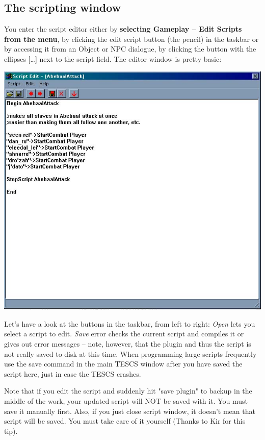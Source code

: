 \documentclass[
]{article}
\begin{document}
\hypertarget{the-scripting-window}{%
\subsection{The scripting window}\label{the-scripting-window}}

You enter the script editor either by \textbf{selecting Gameplay -- Edit
Scripts from the menu}, by clicking the edit script button (the pencil)
in the taskbar or by accessing it from an Object or NPC dialogue, by
clicking the button with the ellipses {[}\ldots{]} next to the script
field. The editor window is pretty basic:

\includegraphics{media/image2.jpg}

Let's have a look at the buttons in the taskbar, from left to right:
\emph{Open} lets you select a script to edit. \emph{Save} error checks
the current script and compiles it or gives out error messages -- note,
however, that the plugin and thus the script is not really saved to disk
at this time. When programming large scripts frequently use the save
command in the main TESCS window after you have saved the script here,
just in case the TESCS crashes.

Note that if you edit the script and suddenly hit "save plugin" to
backup in the middle of the work, your updated script will NOT be saved
with it. You must save it manually first. Also, if you just close script
window, it doesn't mean that script will be saved. You must take care of
it yourself (Thanks to Kir for this tip).
\end{document}
